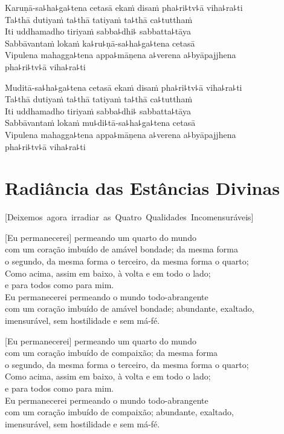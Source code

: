 Karuṇā-sa꜕ha꜕ga꜕tena cetasā ekaṁ disaṁ pha꜕ri꜕tv꜕ā viha꜕ra꜕ti\\
Ta꜕thā dutiyaṁ ta꜕thā tatiyaṁ ta꜕thā ca꜕tutthaṁ\\
Iti uddhamadho tiriyaṁ sabba꜕dhi꜕ sabbatta꜕tāya\\
Sabbāvantaṁ lokaṁ ka꜕ru꜕ṇā-sa꜕ha꜕ga꜕tena cetasā\\
Vipulena mahagga꜕tena appa꜕māṇena a꜕verena a꜕byāpajjhena\\
\vin pha꜕ri꜕tv꜕ā viha꜕ra꜕ti

Muditā-sa꜕ha꜕ga꜕tena cetasā ekaṁ disaṁ pha꜕ri꜕tv꜕ā viha꜕ra꜕ti\\
Ta꜕thā dutiyaṁ ta꜕thā tatiyaṁ ta꜕thā ca꜕tutthaṁ\\
Iti uddhamadho tiriyaṁ sabba꜕dhi꜕ sabbatta꜕tāya\\
Sabbāvantaṁ lokaṁ mu꜕di꜕tā-sa꜕ha꜕ga꜕tena cetasā\\
Vipulena mahagga꜕tena appa꜕māṇena a꜕verena a꜕byāpajjhena\\
\vin pha꜕ri꜕tv꜕ā viha꜕ra꜕ti

\chapter[Radiância das Estâncias Divinas]{Radiância das Estâncias Divinas}

\enlargethispage{\baselineskip}


\begin{leader}
  \vspace*{-\baselineskip}
  \mbox{[Deixemos agora irradiar as Quatro Qualidades Incomensuráveis]}
\end{leader}

[Eu permanecerei] permeando um quarto do mundo\\
\vin com um coração imbuído de amável bondade; da mesma forma\\
\vin o segundo, da mesma forma o terceiro, da mesma forma o quarto;\\
Como acima, assim em baixo, à volta e em todo o lado;\\
\vin e para todos como para mim.\\
Eu permanecerei permeando o mundo todo-abrangente\\
\vin com um coração imbuído de amável bondade; abundante, exaltado,\\
\vin imensurável, sem hostilidade e sem má-fé.

[Eu permanecerei] permeando um quarto do mundo\\
\vin com um coração imbuído de compaixão; da mesma forma\\
\vin o segundo, da mesma forma o terceiro, da mesma forma o quarto;\\
Como acima, assim em baixo, à volta e em todo o lado;\\
\vin e para todos como para mim.\\
Eu permanecerei permeando o mundo todo-abrangente\\
\vin com um coração imbuído de compaixão; abundante, exaltado,\\
\vin imensurável, sem hostilidade e sem má-fé.


